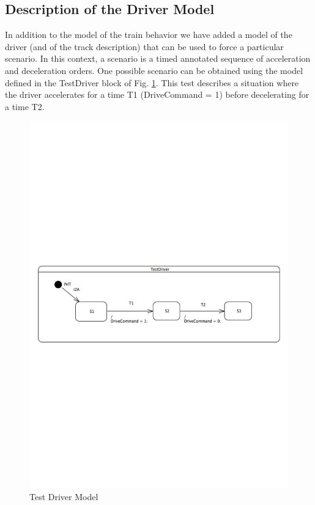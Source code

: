 \subsection{Description of the Driver Model}

In addition to the model of the train behavior we have added a model
of the driver (and of the track description) that can be used to force
a particular scenario. In this context, a scenario is a timed
annotated sequence of acceleration and deceleration orders. One
possible scenario can be obtained using the model defined in the
TestDriver block of Fig. \ref{fig:driver}. This test describes a
situation where the driver accelerates for a time T1 (DriveCommand =
1) before decelerating for a time T2. 

\begin{figure}[ht!]
  \centering
  \includegraphics[height=0.8\textheight]{figures/driver}
  \caption{Test Driver Model}
  \label{fig:driver}
\end{figure}

